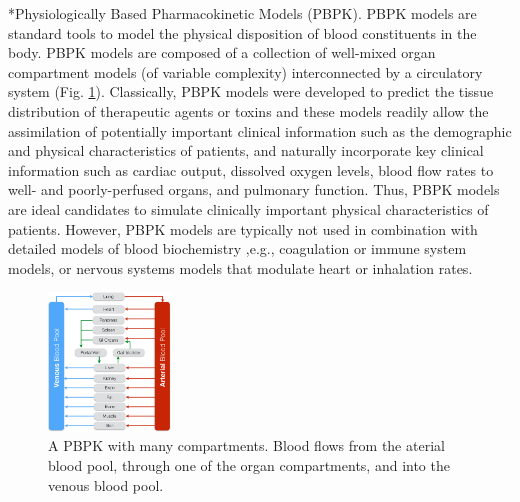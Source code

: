 \documentclass[11pt]{article}
\makeatletter
\renewcommand\subsection{\@startsection
	{subsection}{2}{0mm}
	{-0.05in}
	{-0.5\baselineskip}
	{\normalfont\normalsize\bfseries}}
\makeatother
\begin{document}
\subsection*{Physiologically Based Pharmacokinetic Models (PBPK).}
PBPK models are standard tools to model the physical disposition of blood constituents in the body.
PBPK models are composed of a collection of well-mixed organ compartment models (of variable complexity) interconnected by a circulatory system (Fig. \ref{fig:SamplePBPK}).
Classically, PBPK models were developed to predict the tissue distribution of therapeutic agents or toxins \cite{Gerlowski:1983aa} and these models readily allow the assimilation of potentially important clinical information such as the demographic and physical characteristics of patients,
and naturally incorporate key clinical information such as cardiac output,
dissolved oxygen levels, blood flow rates to well- and poorly-perfused organs, and pulmonary function.
Thus, PBPK models are ideal candidates to simulate clinically important physical characteristics of patients.
However, PBPK models are typically not used in combination with detailed models of blood biochemistry ,e.g., coagulation or immune system models, or nervous systems models that modulate heart or inhalation rates.


\begin{figure}
  \includegraphics[width=0.29\textwidth]{./figs/PBPK-Figure-7-31-14.pdf}
  \caption{A PBPK with many compartments. Blood flows from the aterial blood pool, through one of the organ compartments, and into the venous blood pool.}\label{fig:SamplePBPK}
\end{figure}
\end{document}

